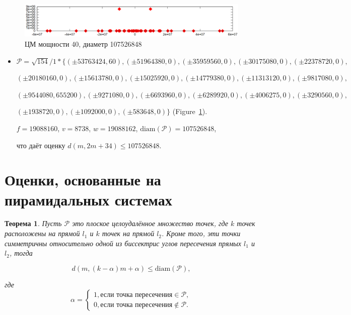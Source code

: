 \documentclass[12pt]{article}
\theoremstyle{theorem}
\newtheorem{theorem}{Теорема}
\theoremstyle{dfn}
\theoremstyle{remark}
\begin{document}
\begin{figure}[h!]
	\begin{center}
	\includegraphics[width=1.1\linewidth]{picture_40.png}
	\parbox{1\linewidth}{\caption{ЦМ мощности 40, диаметр 107526848}
	\label{picture_40.png}}
	\end{center}
\end{figure}

\begin{itemize}
\setlength{\itemsep}{-1mm}

\item
$\mathcal{P}=\sqrt{154}/{1} * \{ (\pm 53763424, 60),
(\pm 51964380 , 0),
(\pm 35959560 , 0),
(\pm 30175080 , 0),
(\pm 22378720 , 0),
$

$
(\pm 20180160 , 0),
(\pm 15613780 , 0),
(\pm 15025920 , 0),
(\pm 14779380 , 0),
(\pm 11313120 , 0),
(\pm 9817080 , 0),
$

$
(\pm 9544080 , 655200),
(\pm 9271080 , 0),
(\pm 6693960 , 0),
(\pm 6289920 , 0),
(\pm 4006275 , 0),
(\pm 3290560 , 0),
$

$
(\pm 1938720 , 0),
(\pm 1092000 , 0),
(\pm 583648 , 0)\}
$
(Figure~\ref{picture_40.png}).

$f = 19088160$, $v = 8738$, $w = 19088162$, $\operatorname{diam(\mathcal{P})}
= 107526848$,

что даёт оценку $d(m, 2m + 34) \leq 107526848$.

\end{itemize}


\section{Оценки, основанные на пирамидальных системах}

\begin{theorem}
Пусть $\mathcal{P}$ это плоское целоудалённое множество точек, где
$k$ точек расположены на прямой $l_{1}$ и $k$ точек на прямой $l_{2}$.
Кроме того, эти точки симметричны относительно одной из биссектрис углов пересечения 
прямых $l_{1}$ и $l_{2}$, тогда

\begin{equation}\label{formula2}
d(m, (k - \alpha)m + \alpha) \leq \operatorname{diam(\mathcal{P})},
\end{equation}

где
\begin{equation*}
\alpha =
\begin{cases}
1, \text{если точка пересечения} \in \mathcal{P}, \\
0, \text{если точка пересечения} \notin \mathcal{P}.
\end{cases}
\end{equation*}

\end{theorem}
\end{document}
